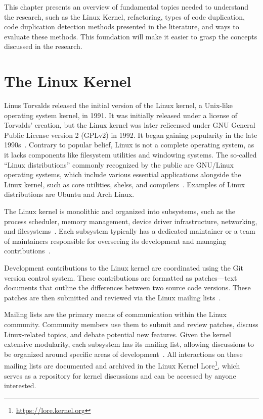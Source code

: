 \en

This chapter presents an overview of fundamental topics needed to understand 
the research, such as the Linux Kernel, refactoring, types of code duplication, 
code duplication detection methods presented in the literature, and ways to 
evaluate these methods. This foundation will make it easier to grasp the 
concepts discussed in the research.

\section{The Linux Kernel}
Linus Torvalds released the initial version of the Linux kernel, a Unix-like operating system kernel, in 1991. It was initially released under a license of Torvalds' creation, but the Linux kernel was later relicensed under GNU General Public License version 2 (GPLv2) in 1992.
%
It began gaining popularity in the late
1990s~\citep{linuxbook}. Contrary to popular belief, Linux is not a
complete operating system, as it lacks components like filesystem utilities and
windowing systems. The so-called ``Linux distributions'' commonly
recognized by the public are GNU/Linux operating systems, which
include various essential applications alongside the Linux kernel,
such as core utilities, shelss, and compilers~\citep{gnuref}. Examples of Linux distributions are Ubuntu 
and Arch Linux.

The Linux kernel is monolithic and organized into subsystems, such as
the process scheduler, memory management, device driver infrastructure,
networking, and filesystems~\citep{melissa}. Each subsystem typically has a
dedicated maintainer or a team of maintainers responsible for overseeing its
development and managing contributions~\citep{melissa}.

Development contributions to the Linux kernel are coordinated using the Git
version control system. These contributions are formatted as patches—text
documents that outline the differences between two source code versions.
These patches are then submitted and reviewed via the Linux mailing lists~\citep{melissa}.

Mailing lists are the primary means of communication within the Linux
community. Community members use them to submit and review patches,
discuss Linux-related topics, and debate potential new features. Given the
kernel extensive modularity, each subsystem has its mailing list, allowing
discussions to be organized around specific areas of development~\citep{melissa}. All interactions on these mailing lists are documented and
archived in the Linux Kernel Lore\footnote{\url{https://lore.kernel.org}}, which serves as a
repository for kernel discussions and can be accessed by anyone interested.

